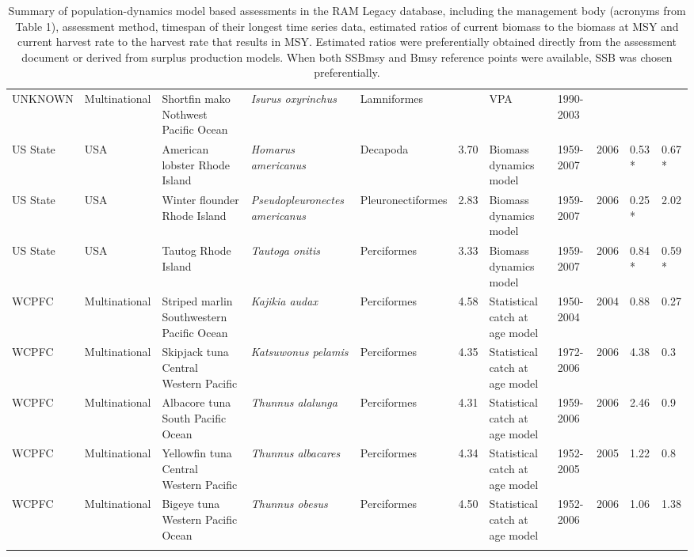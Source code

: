 \begin{longtable}{p{1.5cm}p{1.5cm}p{3cm}p{3cm}p{2.5cm}p{0.9cm}p{1.4cm}p{0.9cm}p{0.9cm}p{0.9cm}p{1cm}}
  UNKNOWN & Multinational & Shortfin mako Nothwest Pacific Ocean & \textit{Isurus oxyrinchus} & Lamniformes &  & VPA & 1990-2003 &  &  &  \\ 
  US State & USA & American lobster Rhode Island & \textit{Homarus americanus} & Decapoda & 3.70 & Biomass dynamics model & 1959-2007 & 2006 & 0.53 * & 0.67 * \\ 
  US State & USA & Winter flounder Rhode Island & \textit{Pseudopleuronectes americanus} & Pleuronectiformes & 2.83 & Biomass dynamics model & 1959-2007 & 2006 & 0.25 * & 2.02 \\ 
  US State & USA & Tautog Rhode Island & \textit{Tautoga onitis} & Perciformes & 3.33 & Biomass dynamics model & 1959-2007 & 2006 & 0.84 * & 0.59 * \\ 
  WCPFC & Multinational & Striped marlin Southwestern Pacific Ocean & \textit{Kajikia audax} & Perciformes & 4.58 & Statistical catch at age model & 1950-2004 & 2004 & 0.88 & 0.27 \\ 
  WCPFC & Multinational & Skipjack tuna Central Western Pacific & \textit{Katsuwonus pelamis} & Perciformes & 4.35 & Statistical catch at age model & 1972-2006 & 2006 & 4.38 & 0.3 \\ 
  WCPFC & Multinational & Albacore tuna South Pacific Ocean & \textit{Thunnus alalunga} & Perciformes & 4.31 & Statistical catch at age model & 1959-2006 & 2006 & 2.46 & 0.9 \\ 
  WCPFC & Multinational & Yellowfin tuna Central Western Pacific & \textit{Thunnus albacares} & Perciformes & 4.34 & Statistical catch at age model & 1952-2005 & 2005 & 1.22 & 0.8 \\ 
  WCPFC & Multinational & Bigeye tuna Western Pacific Ocean & \textit{Thunnus obesus} & Perciformes & 4.50 & Statistical catch at age model & 1952-2006 & 2006 & 1.06 & 1.38 \\ 
   \hline
\hline
\caption{Summary of population-dynamics model based assessments in the RAM Legacy database, including the management body (acronyms from Table 1), assessment method, timespan of their longest time series data, estimated ratios of current biomass to the biomass at MSY and current harvest rate to the harvest rate that results in MSY. Estimated ratios were preferentially obtained directly from the assessment document or derived from surplus production models. When both SSBmsy and Bmsy reference points were available, SSB was chosen preferentially.}
\label{tab:crosshair}
\end{longtable}
